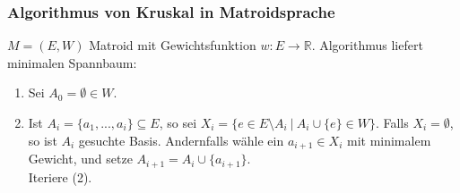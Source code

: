 \begin{frame}
    \frametitle{Algorithmus von Kruskal in Matroidsprache}
    \begin{theorem}
    		$M = (E, W)$ Matroid mit Gewichtsfunktion $w: E \rightarrow \mathbb{R}$. Algorithmus liefert minimalen Spannbaum:
    		\begin{enumerate}
    			\item Sei $A_{0} = \emptyset \in W$.
    			\item Ist $A_{i} = \{ a_{1},...,a_{i}\} \subseteq E$, so sei $X_{i} = \{ e \in E\setminus A_{i} \ | \ A_{i} \cup \{ e\} \in W \}$. Falls $X_{i} = \emptyset$, so ist $A_{i}$ gesuchte Basis. Andernfalls wähle ein $a_{i+1} \in X_{i}$ mit minimalem Gewicht, und setze $A_{i + 1} = A_{i} \cup \{ a_{i+1}\}$. \\ Iteriere (2).
    		\end{enumerate}
    \end{theorem}
\end{frame}
